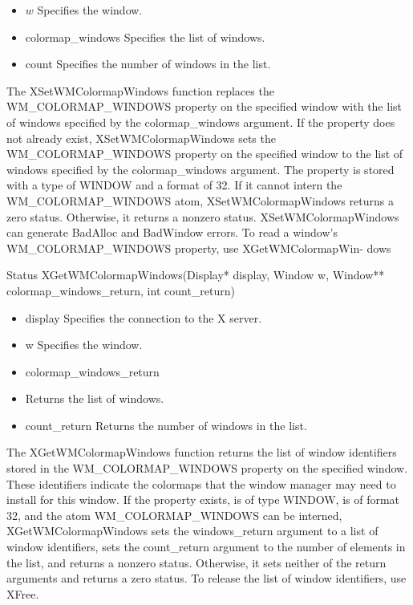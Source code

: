 \documentclass{report}
\begin{document}
\begin{itemize}
\begin{itemize}
\begin{itemize}
                \item $w$ Specifies the window.
                \item colormap\_windows Specifies the list of windows.
                \item count Specifies the number of windows in the list.
            \end{itemize}
            The XSetWMColormapWindows function replaces the WM\_COLORMAP\_WINDOWS property on the specified window with the list of windows specified by the colormap\_windows argument. If the property does not already exist, XSetWMColormapWindows sets the WM\_COLORMAP\_WINDOWS property on the specified window to the list of windows specified by the colormap\_windows argument. The property is stored with a type of WINDOW and a format of 32. If it cannot intern the WM\_COLORMAP\_WINDOWS atom, XSetWMColormapWindows returns a zero status. Otherwise, it returns a nonzero status.
            \bigbreak \noindent 
            XSetWMColormapWindows can generate BadAlloc and BadWindow errors.
            \bigbreak \noindent 
            To read a window’s WM\_COLORMAP\_WINDOWS property, use XGetWMColormapWin- dows
            \bigbreak \noindent 
            \begin{cppcode}
            Status XGetWMColormapWindows(Display* display, Window w, Window** colormap_windows_return, int count_return)
            \end{cppcode}
            \bigbreak \noindent
            \begin{itemize}
                \item display Specifies the connection to the X server.
                \item w Specifies the window.
                \item colormap\_windows\_return
                \item Returns the list of windows.
                \item count\_return Returns the number of windows in the list.
            \end{itemize}
            The XGetWMColormapWindows function returns the list of window identifiers stored in the WM\_COLORMAP\_WINDOWS property on the specified window. These identifiers indicate the colormaps that the window manager may need to install for this window. If the property exists, is of type WINDOW, is of format 32, and the atom WM\_COLORMAP\_WINDOWS can be interned, XGetWMColormapWindows sets the windows\_return argument to a list of window identifiers, sets the count\_return argument to the number of elements in the list, and returns a nonzero status. Otherwise, it sets neither of the return arguments and returns a zero status. To release the list of window identifiers, use XFree.

\end{itemize}
\end{itemize}
\end{document}
